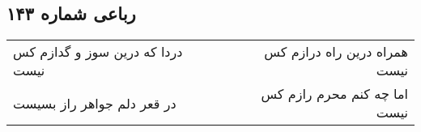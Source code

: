 \begin{center}
\section*{رباعی شماره ۱۴۳}
\label{sec:sh143}
\begin{longtable}{l p{0.5cm} r}
دردا که درین سوز و گدازم کس نیست
&&
همراه درین راه درازم کس نیست
\\
در قعر دلم جواهر راز بسیست
&&
اما چه کنم محرم رازم کس نیست
\\
\end{longtable}
\end{center}
